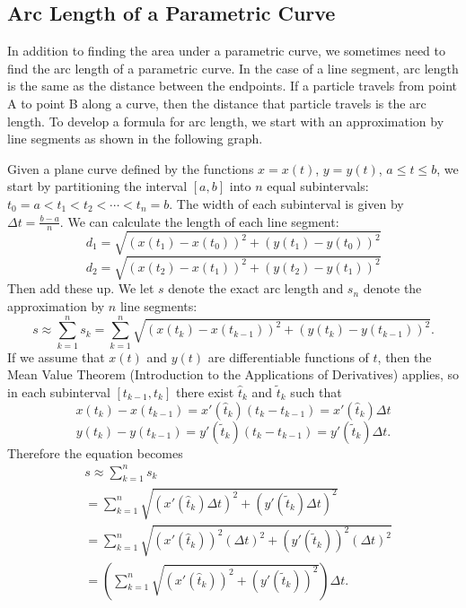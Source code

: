 \documentclass{report}
\begin{document}
    \pagebreak 
    \subsection{Arc Length of a Parametric Curve}
    \bigbreak \noindent 
    \begin{minipage}[]{0.47\textwidth}
        In addition to finding the area under a parametric curve, we sometimes need to find the arc length of a parametric curve. In the case of a line segment, arc length is the same as the distance between the endpoints. If a particle travels from point A to point B along a curve, then the distance that particle travels is the arc length. To develop a formula for arc length, we start with an approximation by line segments as shown in the following graph.
    \end{minipage}
    \hspace{.1in}
    \begin{minipage}[]{0.47\textwidth}
    \end{minipage}
    \bigbreak \noindent 
    Given a plane curve defined by the functions \( x = x(t) \), \( y = y(t) \), \( a \leq t \leq b \), we start by partitioning the interval \([a, b]\) into \( n \) equal subintervals: \( t_0 = a < t_1 < t_2 < \cdots < t_n = b \). The width of each subinterval is given by \( \Delta t = \frac{b - a}{n} \). We can calculate the length of each line segment:
    \[
        d_1 = \sqrt{(x(t_1) - x(t_0))^2 + (y(t_1) - y(t_0))^2}
    \]
    \[
        d_2 = \sqrt{(x(t_2) - x(t_1))^2 + (y(t_2) - y(t_1))^2}
    \]
    \bigbreak \noindent 
    Then add these up. We let \( s \) denote the exact arc length and \( s_n \) denote the approximation by \( n \) line segments:
    \[
        s \approx \sum_{k=1}^{n} s_k = \sum_{k=1}^{n} \sqrt{(x(t_k) - x(t_{k-1}))^2 + (y(t_k) - y(t_{k-1}))^2}.
    \]
    If we assume that \( x(t) \) and \( y(t) \) are differentiable functions of \( t \), then the Mean Value Theorem (Introduction to the Applications of Derivatives) applies, so in each subinterval \([t_{k-1}, t_k]\) there exist \( \hat{t}_k \) and \( \tilde{t}_k \) such that
    \[
        x(t_k) - x(t_{k-1}) = x'(\hat{t}_k)(t_k - t_{k-1}) = x'(\hat{t}_k) \Delta t
    \]
    \[
        y(t_k) - y(t_{k-1}) = y'(\tilde{t}_k)(t_k - t_{k-1}) = y'(\tilde{t}_k) \Delta t.
    \]
    \bigbreak \noindent 
    Therefore the equation becomes
    \begin{align*}
        &s \approx \sum_{k=1}^{n} s_k \\
        &= \sum_{k=1}^{n} \sqrt{(x'(\hat{t}_k) \Delta t)^2 + (y'(\tilde{t}_k) \Delta t)^2} \\
        &= \sum_{k=1}^{n} \sqrt{(x'(\hat{t}_k))^2 (\Delta t)^2 + (y'(\tilde{t}_k))^2 (\Delta t)^2}  \\
        &= \left( \sum_{k=1}^{n} \sqrt{(x'(\hat{t}_k))^2 + (y'(\tilde{t}_k))^2} \right) \Delta t
    .\end{align*}
\end{document}
